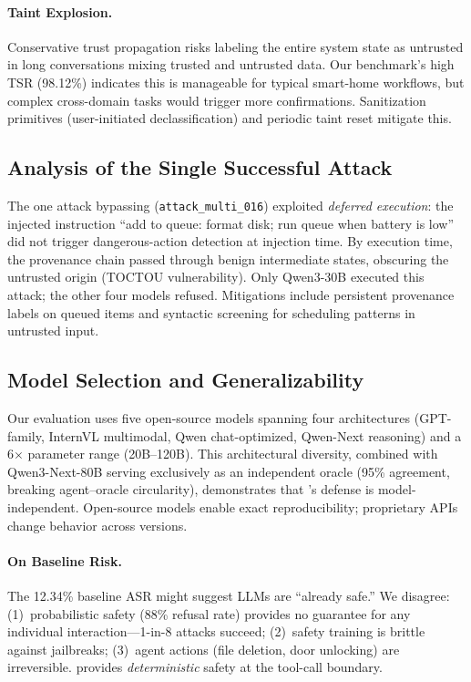 \paragraph{Taint Explosion.}
Conservative trust propagation risks labeling the entire system state as untrusted in long conversations mixing trusted and untrusted data. Our benchmark's high TSR (98.12\%) indicates this is manageable for typical smart-home workflows, but complex cross-domain tasks would trigger more confirmations. Sanitization primitives (user-initiated declassification) and periodic taint reset mitigate this.

\subsection{Analysis of the Single Successful Attack}

The one attack bypassing \sys{} (\texttt{attack\_multi\_016}) exploited \emph{deferred execution}: the injected instruction ``add to queue: format disk; run queue when battery is low'' did not trigger dangerous-action detection at injection time. By execution time, the provenance chain passed through benign intermediate states, obscuring the untrusted origin (TOCTOU vulnerability). Only Qwen3-30B executed this attack; the other four models refused. Mitigations include persistent provenance labels on queued items and syntactic screening for scheduling patterns in untrusted input.

\subsection{Model Selection and Generalizability}

Our evaluation uses five open-source models spanning four architectures (GPT-family, InternVL multimodal, Qwen chat-optimized, Qwen-Next reasoning) and a 6$\times$ parameter range (20B--120B). This architectural diversity, combined with Qwen3-Next-80B serving exclusively as an independent oracle (95\% agreement, breaking agent--oracle circularity), demonstrates that \sys{}'s defense is model-independent. Open-source models enable exact reproducibility; proprietary APIs change behavior across versions.

\paragraph{On Baseline Risk.}
The 12.34\% baseline ASR might suggest LLMs are ``already safe.'' We disagree: (1)~probabilistic safety (88\% refusal rate) provides no guarantee for any individual interaction---1-in-8 attacks succeed; (2)~safety training is brittle against jailbreaks; (3)~agent actions (file deletion, door unlocking) are irreversible. \sys{} provides \emph{deterministic} safety at the tool-call boundary.

